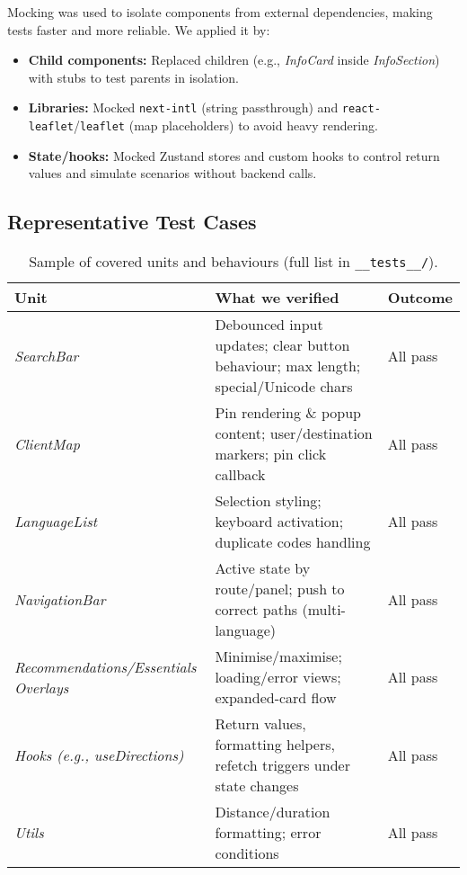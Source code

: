 Mocking was used to isolate components from external dependencies, making tests faster and more reliable. 
We applied it by:
\begin{itemize}
    \item \textbf{Child components:} Replaced children (e.g., \textit{InfoCard} inside \textit{InfoSection}) with stubs to test parents in isolation.  
    \item \textbf{Libraries:} Mocked \texttt{next-intl} (string passthrough) and \texttt{react-leaflet}/\texttt{leaflet} (map placeholders) to avoid heavy rendering.  
    \item \textbf{State/hooks:} Mocked Zustand stores and custom hooks to control return values and simulate scenarios without backend calls.  
\end{itemize}

\clearpage
\subsection{Representative Test Cases}
\begin{table}[h!]
\centering
\small
\begin{tabular}{p{3.2cm} p{6.7cm} p{3.2cm}}
\toprule
\textbf{Unit} & \textbf{What we verified} & \textbf{Outcome}\\
\midrule
\textit{SearchBar} & Debounced input updates; clear button behaviour; max length; special/Unicode chars & All pass \\
\textit{ClientMap} & Pin rendering \& popup content; user/destination markers; pin click callback & All pass \\
\textit{LanguageList} & Selection styling; keyboard activation; duplicate codes handling & All pass \\
\textit{NavigationBar} & Active state by route/panel; push to correct paths (multi-language) & All pass \\
\textit{Recommendations/Essen\-tials Overlays} & Minimise/maximise; loading/error views; expanded-card flow & All pass \\
\textit{Hooks (e.g., useDirections)} & Return values, formatting helpers, refetch triggers under state changes & All pass \\
\textit{Utils} & Distance/duration formatting; error conditions & All pass \\
\bottomrule
\end{tabular}
\caption{Sample of covered units and behaviours (full list in \texttt{\_\_tests\_\_/}).}
\label{tab:fe-unit-coverage}
\end{table}

